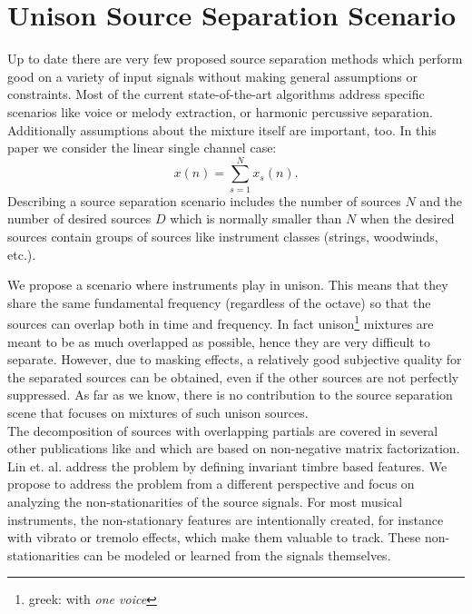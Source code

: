 \section{Unison Source Separation Scenario}
\label{sec:scenario}

Up to date there are very few proposed source separation methods which perform good on a variety of input signals without making general assumptions or constraints. Most of the current state-of-the-art algorithms address specific scenarios like voice or melody extraction, or harmonic percussive separation. Additionally assumptions about the mixture itself are important, too. In this paper we consider the linear single channel case:
\begin{equation}
  x(n) = \sum_{s = 1}^{N} x_s(n).
\end{equation}
Describing a source separation scenario includes the number of sources $N$ and the number of desired sources $D$ which is normally smaller than $N$ when the desired sources contain groups of sources like instrument classes (strings, woodwinds, etc.).

We propose a scenario where instruments play in unison. This means that they share the same fundamental frequency (regardless of the octave) so that the sources can overlap both in time and frequency. In fact unison\footnote{greek: with \emph{one voice}} mixtures are meant to be as much overlapped as possible, hence they are very difficult to separate. However, due to masking effects, a relatively good subjective quality for the separated sources can be obtained, even if the other sources are not perfectly suppressed.
As far as we know, there is no contribution to the source separation scene that focuses on mixtures of such unison sources. \\

The decomposition of sources with overlapping partials are covered in several other publications like \cite{nakano2010nonnegative} and \cite{smaragdis2008sparse} which are based on non-negative matrix factorization. Lin et. al. \cite{lintimbre} address the problem by defining invariant timbre based features. We propose to address the problem from a different perspective and focus on analyzing the non-stationarities of the source signals. For most musical instruments, the non-stationary features are intentionally created, for instance with vibrato or tremolo effects, which make them valuable to track. These non-stationarities can be modeled or learned from the signals themselves. \\

